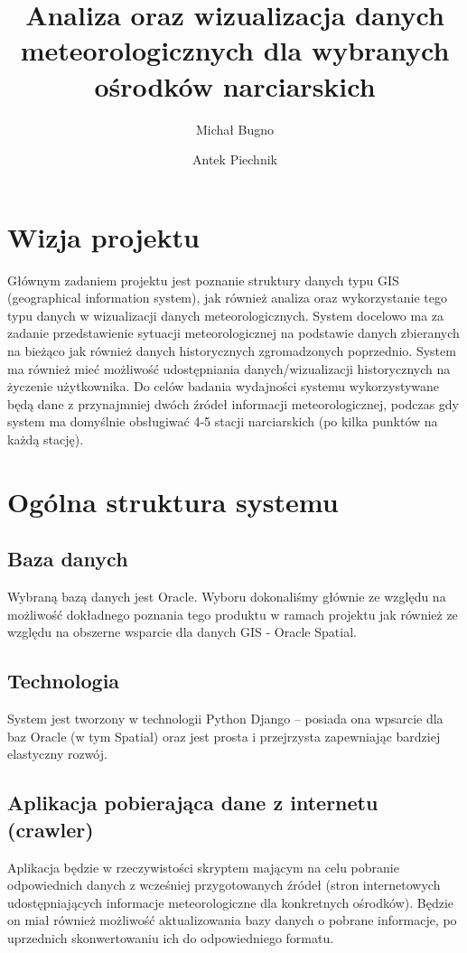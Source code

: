 \documentclass[12pt]{article}
\author{Michał Bugno \and Antek Piechnik}
\title{Analiza oraz wizualizacja danych meteorologicznych dla wybranych ośrodków narciarskich}
\begin{document}
\maketitle
\tableofcontents
\newpage

\section{Wizja projektu}
Głównym zadaniem projektu jest poznanie struktury
danych typu GIS (geographical information system), jak również analiza oraz
wykorzystanie tego typu danych w wizualizacji danych meteorologicznych. System
docelowo ma za zadanie przedstawienie sytuacji meteorologicznej na podstawie
danych zbieranych na bieżąco jak również danych historycznych zgromadzonych
poprzednio. System ma również mieć możliwość udostępniania danych/wizualizacji
historycznych na życzenie użytkownika. Do celów badania wydajności systemu
wykorzystywane będą dane z przynajmniej dwóch źródeł informacji
meteorologicznej, podczas gdy system ma domyślnie obsługiwać 4-5 stacji
narciarskich (po kilka punktów na każdą stację).

\section{Ogólna struktura systemu}

\subsection{Baza danych}
Wybraną bazą danych jest Oracle. Wyboru dokonaliśmy głównie ze względu na
możliwość dokładnego poznania tego produktu w ramach projektu jak również ze
względu na obszerne wsparcie dla danych GIS - Oracle Spatial.

\subsection{Technologia}
System jest tworzony w technologii Python Django -- posiada ona wpsarcie dla
baz Oracle (w tym Spatial) oraz jest prosta i przejrzysta zapewniając
bardziej elastyczny rozwój.

\subsection{Aplikacja pobierająca dane z internetu (crawler)}
Aplikacja będzie w rzeczywistości skryptem mającym na celu pobranie
odpowiednich danych z wcześniej przygotowanych źródeł (stron internetowych
    udostępniających informacje meteorologiczne dla konkretnych ośrodków).
Będzie on miał również możliwość aktualizowania bazy danych o pobrane
informacje, po uprzednich skonwertowaniu ich do odpowiedniego formatu.
\end{document}
